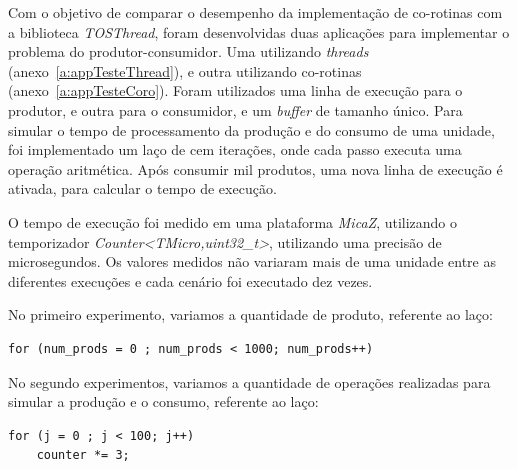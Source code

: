 Com o objetivo de comparar o desempenho da implementação de co-rotinas com a biblioteca \textit{TOSThread}, foram
desenvolvidas duas aplicações para implementar o problema do produtor-consumidor.
Uma utilizando \textit{threads} (anexo~\ref{a:appTesteThread}), e outra utilizando co-rotinas (anexo~\ref{a:appTesteCoro}).
Foram utilizados uma linha de execução para o produtor, e outra para o consumidor, e um \textit{buffer} de tamanho
único. Para simular o tempo de processamento da produção e do consumo de uma unidade, foi implementado um laço de cem iterações, onde
cada passo executa uma operação aritmética. Após consumir mil produtos, uma nova linha de execução é ativada, para
calcular o tempo de execução.

O tempo de execução foi medido em uma plataforma \textit{MicaZ}, utilizando o temporizador
\textit{Counter<TMicro,uint32\_t>}, utilizando uma precisão de microsegundos. 
Os valores medidos não variaram mais de uma unidade entre as diferentes execuções e cada cenário foi executado dez
vezes.

No primeiro experimento, variamos a quantidade de produto, referente ao laço: 
\begin{lstlisting}
for (num_prods = 0 ; num_prods < 1000; num_prods++)
\end{lstlisting}
No segundo experimentos, variamos a quantidade de operações realizadas para simular a produção e o consumo, referente ao
laço:
\begin{lstlisting}
for (j = 0 ; j < 100; j++)
    counter *= 3;
\end{lstlisting}

